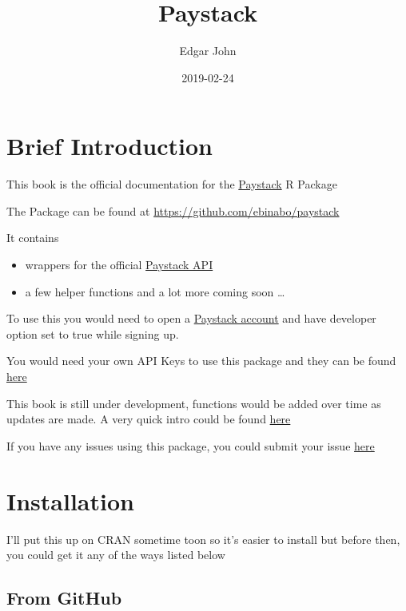 \documentclass[]{book}
\title{Paystack}
\author{Edgar John}
\date{2019-02-24}
\providecommand{\tightlist}{%
  \setlength{\itemsep}{0pt}\setlength{\parskip}{0pt}}
\begin{document}
\maketitle

{
\setcounter{tocdepth}{1}
\tableofcontents
}
\chapter{Brief Introduction}\label{brief-introduction}

This book is the official documentation for the
\href{https://paystack.com/}{Paystack} R Package

The Package can be found at \url{https://github.com/ebinabo/paystack}

It contains

\begin{itemize}
\tightlist
\item
  wrappers for the official
  \href{https://developers.paystack.co/v1.0/reference\#paystack-inline-x}{Paystack
  API}
\item
  a few helper functions and a lot more coming soon \ldots{}
\end{itemize}

To use this you would need to open a
\href{https://dashboard.paystack.com/\#/signup}{Paystack account} and
have developer option set to true while signing up.

You would need your own API Keys to use this package and they can be
found \href{https://dashboard.paystack.com/\#/settings/developer}{here}

This book is still under development, functions would be added over time
as updates are made. A very quick intro could be found
\href{https://bookdown.org/edgarjohn95/paystack/how-to-rpubs.html\#/}{here}

If you have any issues using this package, you could submit your issue
\href{https://github.com/ebinabo/paystack/issues/new}{here}

\chapter{Installation}\label{installation}

I'll put this up on CRAN sometime toon so it's easier to install but
before then, you could get it any of the ways listed below

\section{From GitHub}\label{from-github}
\end{document}

